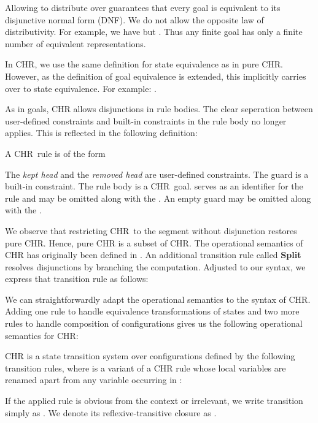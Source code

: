 \documentclass[acmtocl]{acmtrans2m}
\newcommand{\chrv}{CHR}
\begin{document}
Allowing  to distribute over  guarantees that every goal is
equivalent to its disjunctive normal form (DNF). We do not allow the opposite
law of distributivity. For example, we have  but . Thus any finite goal has only a finite
number of equivalent representations.

In CHR, we use the same definition for state equivalence as in pure CHR.
However, as the
definition of goal equivalence is extended, this implicitly carries over to
state equivalence. For example:
.

As in goals, CHR allows disjunctions in rule bodies. The clear
seperation between user-defined constraints and built-in constraints in the
rule body no longer applies. This is reflected in the following definition:

\begin{definition}[\chrv\ Rules]
	\label{def:chrv-rule}
A \chrv\ rule is of the form

The \emph{kept head}  and the \emph{removed head}  are
user-defined constraints. The guard  is a built-in
constraint. The rule body  is a \chrv\ goal.  serves as an identifier for
the rule and may be omitted along with the . An empty guard may be omitted
along with the .
\end{definition}

We observe that restricting \chrv\ to the segment without disjunction restores
pure CHR. Hence, pure CHR is a subset of \chrv. The operational semantics of
CHR has originally been defined in \cite{DBLP:conf/fqas/AbdennadherS98}.
An additional transition rule called \textbf{Split} resolves disjunctions by
branching the computation. Adjusted to our syntax, we express that transition rule as
follows:


We can straightforwardly adapt the operational semantics  to the syntax of
CHR. Adding one rule to handle equivalence transformations of states and
two more rules to handle composition of configurations gives us the following
operational semantics for CHR:

\begin{definition}
CHR is a state transition system over configurations
defined by the following transition rules, where  is a variant of a CHR rule whose local
variables  are renamed apart from any variable occurring in :



\vspace{1mm}

If the applied rule is obvious from the context or irrelevant, we write
transition simply as . We denote its reflexive-transitive closure
as .
\end{definition}
\end{document}

